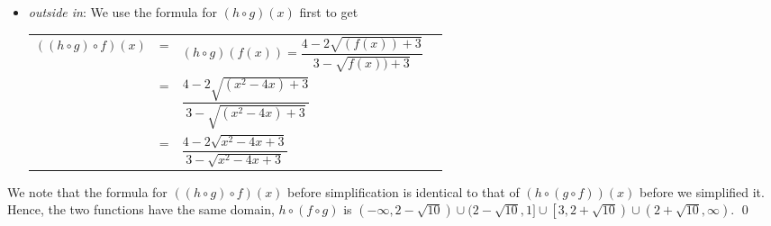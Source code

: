 \begin{ex}
\begin{enumerate}
\begin{itemize}
\item  \textit{outside in}:  We use the formula for $(h \circ g)(x)$ first to get
\begin{longtable}{rclr} $((h \circ g) \circ f)(x)$ & = & $(h \circ g)(f(x))=\dfrac{4-2\sqrt{(f(x))+3}}{3-\sqrt{f(x))+3}}$  & \\ [12pt]
  & = & $\dfrac{4 - 2\sqrt{\left(x^2-4x\right)+3}}{3 - \sqrt{\left(x^2-4x\right)+3}}$ & \\[12pt]
 & = & $\dfrac{4 - 2\sqrt{x^2-4x+3}}{3 - \sqrt{x^2-4x+3}}$ & \\
 \end{longtable}
 
 \end{itemize}

 
We note that the formula for $((h \circ g) \circ f)(x)$ before simplification is identical to that of $(h \circ (g \circ f))(x)$ before we simplified it.  Hence, the two functions have the same domain, $h \circ (f \circ g)$ is $(-\infty, 2 -\sqrt{10}) \cup (2 - \sqrt{10}, 1] \cup \left[3, 2 + \sqrt{10}\right) \cup \left(2+\sqrt{10}, \infty\right)$. \qed

\end{enumerate}

\label{functioncompex1}
\end{ex}


